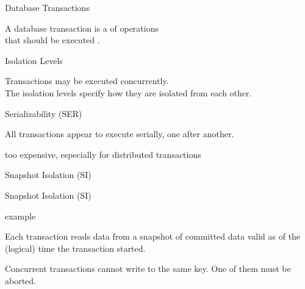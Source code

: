 
\begin{frame}{Database Transactions}
  \begin{center}
    A database transaction is a  of operations \\[10pt]
    that should be executed .
  \end{center}
\end{frame}

\begin{frame}{Isolation Levels}
  \begin{center}
    Transactions may be executed concurrently. \\[6pt]
    The isolation levels specify how they are isolated from each other.
    \vspace{0.60cm}
  \end{center}
\end{frame}

\begin{frame}{Serializability (SER)}
  \begin{center}
    All transactions appear to execute serially, one after another.

    \vspace{0.60cm}
    too expensive, especially for distributed transactions
  \end{center}
\end{frame}

\begin{frame}{Snapshot Isolation (SI)}
  \begin{center}
  \end{center}
\end{frame}

\begin{frame}{Snapshot Isolation (SI)}
  \begin{center}
    example
    \vspace{0.60cm}
    \begin{description}
      \item[Snapshot Read:] Each transaction reads data from a snapshot
        of committed data valid as of the (logical) time the transaction started.
      \item[Snapshot Write:] Concurrent transactions cannot write to the same key.
        One of them must be aborted.
    \end{description}
  \end{center}
\end{frame}


